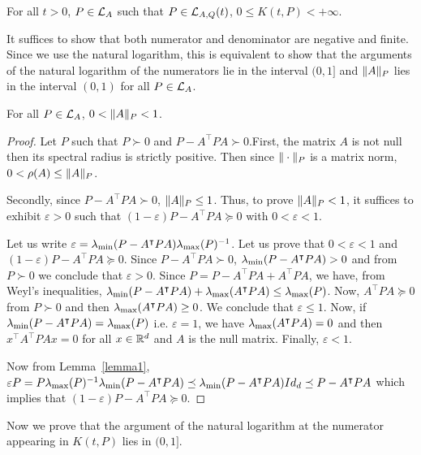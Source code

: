 \documentclass[10pt]{article}
\begin{document}
\begin{prop}
For all $t>0$, $P\in \mathcal{L}_{A}$ such that $P\in \mathcal{L}_{A,Q}(t)$, $0\leq K(t,P)< +\infty$.  
\end{prop}

It suffices to show that both numerator and denominator are negative and finite. Since we use the natural logarithm, this is equivalent to show that the arguments of the natural logarithm of the numerators lie in the interval $(0,1]$ and $\| A\|_P$ lies in the interval $(0,1)$ for all $P\in\mathcal{L}_{A}$. 

\begin{lemma}
\label{lyapnorm}
For all $P\in\mathcal{L}_{A}$, $0<\| A\|_P<1$. 
\end{lemma}

\begin{proof}
Let $P$ such that $P\succ 0$ and $P-A^\intercal P A\succ 0$.First, the matrix $A$ is not null then its spectral radius is strictly positive. Then since $\| \cdot\|_P$ is a matrix norm, $0<\rho(A) \leq \| A\|_P$.

Secondly, since $P-A^\intercal P A\succ 0$, $\| A\|_P\leq 1$. Thus, to prove $\| A\|_P<1$, it suffices to exhibit $\varepsilon>0$ such that $(1-\varepsilon) P-A^\intercal P A\succeq 0$ with $0<\varepsilon<1$. 

Let us write $\varepsilon=\lambda_{\operatorname{min}}(P-A^\intercal P A) \lambda_{\operatorname{max}}(P)^{-1}$. Let us prove that $0<\varepsilon<1$ and $(1-\varepsilon) P-A^\intercal P A\succeq 0$.  Since $P-A^\intercal P A\succ 0$, $\lambda_{\operatorname{min}}(P-A^\intercal P A)>0$ and from $P\succ 0$ we conclude that $\varepsilon >0$. Since $P=P-A^ \intercal P A +A^\intercal P A$, we have, from Weyl's inequalities, $\lambda_{\operatorname{min}}(P-A^\intercal P A)+\lambda_{\operatorname{max}}(A^\intercal P A)\leq \lambda_{\operatorname{max}}(P)$. Now, $A^\intercal P A\succeq 0$ from $P\succ 0$ and then $\lambda_{\operatorname{max}}(A^\intercal P A)\geq 0$. We conclude that $\varepsilon\leq 1$. Now, if $\lambda_{\operatorname{min}}(P-A^\intercal P A)=\lambda_{\operatorname{max}}(P)$ i.e. $\varepsilon=1$, we have 
$\lambda_{\operatorname{max}}(A^\intercal P A)=0$ and then $x^\intercal A^\intercal P A x=0$ for all $x\in \mathbb R^d$ and $A$ is the null matrix. 
Finally, $\varepsilon<1$. 

Now from Lemma~\ref{lemma1}, $\varepsilon P=P\lambda_{\operatorname{max}}(P)^{-1}\lambda_{\operatorname{min}}(P-A^\intercal P A)\preceq \lambda_{\operatorname{min}}(P-A^\intercal P A)Id_d\preceq 
P-A^\intercal P A$ which implies that $(1-\varepsilon) P -A^\intercal P A\succeq 0$. 
\end{proof}

Now we prove that the argument of the natural logarithm at the numerator appearing in $K(t,P)$ lies in $(0,1]$. 
\end{document}
